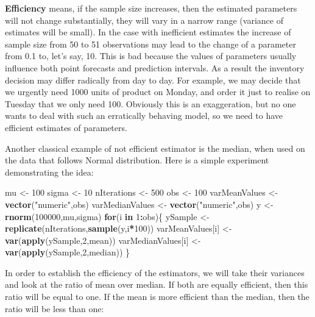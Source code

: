 \documentclass[
]{book}
\newenvironment{Shaded}{\begin{snugshade}}{\end{snugshade}}
\newcommand{\ControlFlowTok}[1]{\textcolor[rgb]{0.13,0.29,0.53}{\textbf{#1}}}
\newcommand{\DecValTok}[1]{\textcolor[rgb]{0.00,0.00,0.81}{#1}}
\newcommand{\KeywordTok}[1]{\textcolor[rgb]{0.13,0.29,0.53}{\textbf{#1}}}
\newcommand{\NormalTok}[1]{#1}
\newcommand{\OperatorTok}[1]{\textcolor[rgb]{0.81,0.36,0.00}{\textbf{#1}}}
\newcommand{\StringTok}[1]{\textcolor[rgb]{0.31,0.60,0.02}{#1}}
\theoremstyle{definition}
\theoremstyle{definition}
\theoremstyle{definition}
\theoremstyle{definition}
\theoremstyle{remark}
\begin{document}
\textbf{Efficiency} means, if the sample size increases, then the estimated parameters will not change substantially, they will vary in a narrow range (variance of estimates will be small). In the case with inefficient estimates the increase of sample size from 50 to 51 observations may lead to the change of a parameter from 0.1 to, let's say, 10. This is bad because the values of parameters usually influence both point forecasts and prediction intervals. As a result the inventory decision may differ radically from day to day. For example, we may decide that we urgently need 1000 units of product on Monday, and order it just to realise on Tuesday that we only need 100. Obviously this is an exaggeration, but no one wants to deal with such an erratically behaving model, so we need to have efficient estimates of parameters.

Another classical example of not efficient estimator is the median, when used on the data that follows Normal distribution. Here is a simple experiment demonstrating the idea:

\begin{Shaded}
\begin{Highlighting}[]
\NormalTok{mu \textless{}{-}}\StringTok{ }\DecValTok{100}
\NormalTok{sigma \textless{}{-}}\StringTok{ }\DecValTok{10}
\NormalTok{nIterations \textless{}{-}}\StringTok{ }\DecValTok{500}
\NormalTok{obs \textless{}{-}}\StringTok{ }\DecValTok{100}
\NormalTok{varMeanValues \textless{}{-}}\StringTok{ }\KeywordTok{vector}\NormalTok{(}\StringTok{"numeric"}\NormalTok{,obs)}
\NormalTok{varMedianValues \textless{}{-}}\StringTok{ }\KeywordTok{vector}\NormalTok{(}\StringTok{"numeric"}\NormalTok{,obs)}
\NormalTok{y \textless{}{-}}\StringTok{ }\KeywordTok{rnorm}\NormalTok{(}\DecValTok{100000}\NormalTok{,mu,sigma)}
\ControlFlowTok{for}\NormalTok{(i }\ControlFlowTok{in} \DecValTok{1}\OperatorTok{:}\NormalTok{obs)\{}
\NormalTok{    ySample \textless{}{-}}\StringTok{ }\KeywordTok{replicate}\NormalTok{(nIterations,}\KeywordTok{sample}\NormalTok{(y,i}\OperatorTok{*}\DecValTok{100}\NormalTok{))}
\NormalTok{    varMeanValues[i] \textless{}{-}}\StringTok{ }\KeywordTok{var}\NormalTok{(}\KeywordTok{apply}\NormalTok{(ySample,}\DecValTok{2}\NormalTok{,mean))}
\NormalTok{    varMedianValues[i] \textless{}{-}}\StringTok{ }\KeywordTok{var}\NormalTok{(}\KeywordTok{apply}\NormalTok{(ySample,}\DecValTok{2}\NormalTok{,median))}
\NormalTok{\}}
\end{Highlighting}
\end{Shaded}

In order to establish the efficiency of the estimators, we will take their variances and look at the ratio of mean over median. If both are equally efficient, then this ratio will be equal to one. If the mean is more efficient than the median, then the ratio will be less than one:
\end{document}
